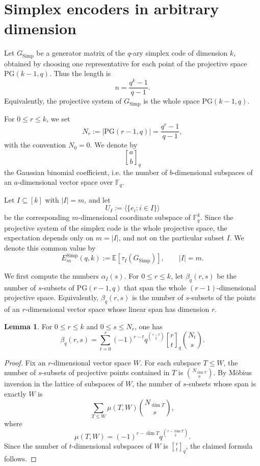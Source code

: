 \documentclass[11pt,a4paper]{article}
\numberwithin{equation}{section}
\theoremstyle{definition}
\theoremstyle{definition}
\newtheorem{lemma}[definition]{Lemma}
\newcommand{\F}{\mathbb{F}}
\newcommand{\PG}{\mathrm{PG}}
\newcommand{\E}{\mathbb{E}}
\newcommand{\Span}{\langle}
\newcommand{\qbinom}[2]{\genfrac{[}{]}{0pt}{}{#1}{#2}_q}
\begin{document}
\section{Simplex encoders in arbitrary dimension}\label{sec:simplex-general}

Let $G_{\mathrm{Simp}}$ be a generator matrix of the $q$-ary simplex code of dimension $k$, obtained by choosing one representative for each point of the projective space $\PG(k-1,q)$.  Thus the length is
\[
n=\frac{q^k-1}{q-1}.
\]
Equivalently, the projective system of $G_{\mathrm{Simp}}$ is the whole space $\PG(k-1,q)$.

For $0\leq r\leq k$, we set
\[
N_r:=|\PG(r-1,q)|=\frac{q^r-1}{q-1},
\]
with the convention $N_0=0$.  We denote by
\[
\qbinom{a}{b}
\]
the Gaussian binomial coefficient, i.e. the number of $b$-dimensional subspaces of an $a$-dimensional vector space over $\F_q$.

Let $I\subseteq[k]$ with $|I|=m$, and let
\[
U_I:=\Span\{e_i:i\in I\}\rangle
\]
be the corresponding $m$-dimensional coordinate subspace of $\F_q^k$.  Since the projective system of the simplex code is the whole projective space, the expectation depends only on $m=|I|$, and not on the particular subset $I$.  We denote this common value by
\[
E_m^{\mathrm{Simp}}(q,k):=\E[\tau_I(G_{\mathrm{Simp}})],
\qquad |I|=m.
\]

We first compute the numbers $\alpha_I(s)$.  For $0\leq r\leq k$, let $\beta_q(r,s)$ be the number of $s$-subsets of $\PG(r-1,q)$ that span the whole $(r-1)$-dimensional projective space.  Equivalently, $\beta_q(r,s)$ is the number of $s$-subsets of the points of an $r$-dimensional vector space whose linear span has dimension $r$.

\begin{lemma}\label{lem:beta-simplex}
For $0\leq r\leq k$ and $0\leq s\leq N_r$, one has
\[
\beta_q(r,s)
=
\sum_{t=0}^{r}
(-1)^{r-t}
q^{\binom{r-t}{2}}
\qbinom{r}{t}
\binom{N_t}{s}.
\]
\end{lemma}

\begin{proof}
Fix an $r$-dimensional vector space $W$.  For each subspace $T\leq W$, the number of $s$-subsets of projective points contained in $T$ is $\binom{N_{\dim T}}{s}$.  By M\"obius inversion in the lattice of subspaces of $W$, the number of $s$-subsets whose span is exactly $W$ is
\[
\sum_{T\leq W}
\mu(T,W)\binom{N_{\dim T}}{s},
\]
where
\[
\mu(T,W)=
(-1)^{r-\dim T}q^{\binom{r-\dim T}{2}}.
\]
Since the number of $t$-dimensional subspaces of $W$ is $\qbinom{r}{t}$, the claimed formula follows.
\end{proof}
\end{document}
